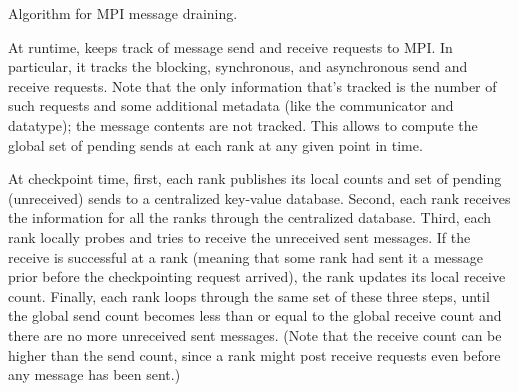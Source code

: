 \documentclass[11pt,letter]{article}
\begin{document}
\begin{algorithm}
  \begin{algorithmic}[1]
    \caption{\label{algo:mpiDrainAlgo} Algorithm for MPI message draining.}
          \EndWhile
        \EndFor
      \EndEvent
          \EndIf
        \EndFor
      \EndFunction
          \EndIf
        \EndFor
      \EndProcedure
  \end{algorithmic}
\end{algorithm}

At runtime, \mpiSol{} keeps track of message send and receive requests to MPI. In
particular, it tracks the blocking, synchronous, and asynchronous send and
receive requests. Note that the only information that's tracked is the number
of such requests and some additional metadata (like the communicator and
datatype); the message contents are not tracked. This allows \mpiSol{} to compute
the global set of pending sends at each rank at any given point in time.

At checkpoint time, first, each rank publishes its local counts and set of
pending (unreceived) sends to a centralized key-value database. Second, each
rank receives the information for all the ranks through the centralized
database. Third, each rank locally probes and tries to receive the unreceived
sent messages. If the receive is successful at a rank (meaning that some rank
had sent it a message prior before the checkpointing request arrived),
the rank updates its local receive count. Finally, each rank loops through
the same set of these three steps, until the global send count becomes less
than or equal to the global receive count and there are no more unreceived
sent messages. (Note that the receive count can be higher than the send
count, since a rank might post receive requests even before any message has
been sent.)
\end{document}
